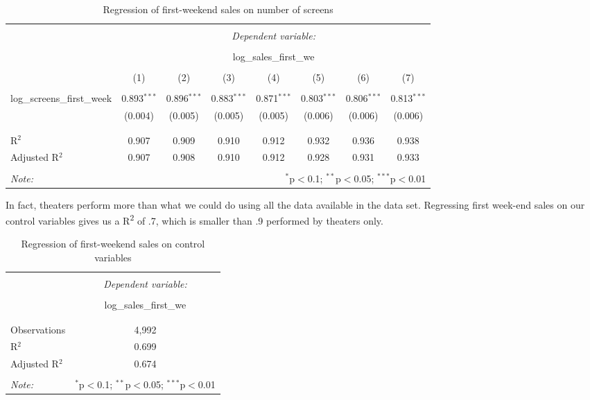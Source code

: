 \begin{table}[!htbp] \centering 
	\caption{Regression of first-weekend sales on number of screens} 
	\label{part2.1_tab1} 
	\begin{tabular}{@{\extracolsep{5pt}}lccccccc} 
		\\[-1.8ex]\hline 
		\hline \\[-1.8ex] 
		& \multicolumn{7}{c}{\textit{Dependent variable:}} \\ 
		\cline{2-8} 
		\\[-1.8ex] & \multicolumn{7}{c}{log\_sales\_first\_we} \\ 
		\\[-1.8ex] & (1) & (2) & (3) & (4) & (5) & (6) & (7)\\ 
		\hline \\[-1.8ex] 
		log\_screens\_first\_week & 0.893$^{***}$ & 0.896$^{***}$ & 0.883$^{***}$ & 0.871$^{***}$ & 0.803$^{***}$ & 0.806$^{***}$ & 0.813$^{***}$ \\ 
		& (0.004) & (0.005) & (0.005) & (0.005) & (0.006) & (0.006) & (0.006) \\ 
		& & & & & & & \\ 
		\hline \\[-1.8ex] 
		R$^{2}$ & 0.907 & 0.909 & 0.910 & 0.912 & 0.932 & 0.936 & 0.938 \\ 
		Adjusted R$^{2}$ & 0.907 & 0.908 & 0.910 & 0.912 & 0.928 & 0.931 & 0.933 \\ 
		\hline 
		\hline \\[-1.8ex] 
		\textit{Note:}  & \multicolumn{7}{r}{$^{*}$p$<$0.1; $^{**}$p$<$0.05; $^{***}$p$<$0.01} \\ 
	\end{tabular} 
\end{table} 
In fact, theaters perform more than what we could do using all the data available in the data set. Regressing first week-end sales on our control variables gives us a R\textsuperscript{2} of .7, which is smaller than .9 performed by theaters only.
\begin{table}[!htbp] \centering 
	\caption{Regression of first-weekend sales on control variables} 
	\label{part2.1_tab2} 
	\begin{tabular}{@{\extracolsep{5pt}}lc} 
		\\[-1.8ex]\hline 
		\hline \\[-1.8ex] 
		& \multicolumn{1}{c}{\textit{Dependent variable:}} \\ 
		\cline{2-2} 
		\\[-1.8ex] & log\_sales\_first\_we \\ 
		\hline \\[-1.8ex] 
		\hline \\[-1.8ex] 
		Observations & 4,992 \\ 
		R$^{2}$ & 0.699 \\ 
		Adjusted R$^{2}$ & 0.674 \\ 
		\hline 
		\hline \\[-1.8ex] 
		\textit{Note:}  & \multicolumn{1}{r}{$^{*}$p$<$0.1; $^{**}$p$<$0.05; $^{***}$p$<$0.01} \\ 
	\end{tabular} 
\end{table}
